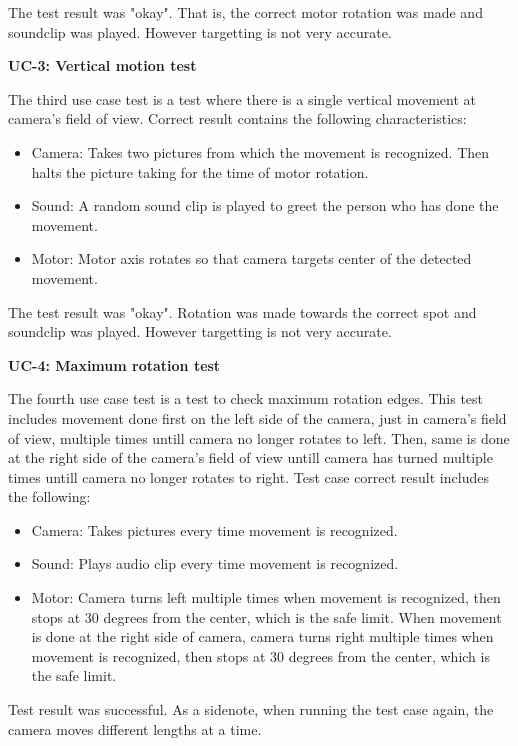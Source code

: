\documentclass[english,11pt,twoside,a4paper]{article}
\begin{document}
The test result was "okay". That is, the correct motor rotation was made and soundclip was played. However targetting is not very accurate.

\textbf{UC-3: Vertical motion test}

The third use case test is a test where there is a single vertical movement at camera's field of view. Correct result contains the following characteristics:

\begin{itemize}
  \item Camera: Takes two pictures from which the movement is recognized. Then halts the picture taking for the time of motor rotation.
  \item Sound: A random sound clip is played to greet the person who has done the movement.
  \item Motor: Motor axis rotates so that camera targets center of the detected movement.
\end{itemize}

The test result was "okay". Rotation was made towards the correct spot and soundclip was played. However targetting is not very accurate.

\textbf{UC-4: Maximum rotation test}

The fourth use case test is a test to check maximum rotation edges. This test includes movement done first on the left side of the camera, just in camera's field of view, multiple times untill camera no longer rotates to left. Then, same is done at the right side of the camera's field of view untill camera has turned multiple times untill camera no longer rotates to right. Test case correct result includes the following:

\begin{itemize}
  \item Camera: Takes pictures every time movement is recognized.
  \item Sound: Plays audio clip every time movement is recognized.
  \item Motor: Camera turns left multiple times when movement is recognized, then stops at 30 degrees from the center, which is the safe limit. When movement is done at the right side of camera, camera turns right multiple times when movement is recognized, then stops at 30 degrees from the center, which is the safe limit.
\end{itemize}

Test result was successful. As a sidenote, when running the test case again, the camera moves different lengths at a time.
\end{document}
